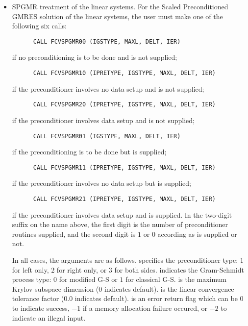 \begin{enumerate}
\begin{itemize}
  \item
    SPGMR treatment of the linear systems.
    For the Scaled Preconditioned GMRES solution of the linear systems,
    the user must make one of the following six calls:
\begin{verbatim}
      CALL FCVSPGMR00 (IGSTYPE, MAXL, DELT, IER)              
\end{verbatim}
    if no preconditioning is to be done and  is not supplied;
\begin{verbatim}
      CALL FCVSPGMR10 (IPRETYPE, IGSTYPE, MAXL, DELT, IER)
\end{verbatim}
    if the preconditioner involves no data setup and  is not
    supplied;
\begin{verbatim}
      CALL FCVSPGMR20 (IPRETYPE, IGSTYPE, MAXL, DELT, IER)
\end{verbatim}
    if the preconditioner involves data setup and  is not
    supplied;
\begin{verbatim}
      CALL FCVSPGMR01 (IGSTYPE, MAXL, DELT, IER)
\end{verbatim}
    if the preconditioning is to be done but  is supplied;
\begin{verbatim}
      CALL FCVSPGMR11 (IPRETYPE, IGSTYPE, MAXL, DELT, IER)
\end{verbatim}
    if the preconditioner involves no data setup but  is supplied;
\begin{verbatim}
      CALL FCVSPGMR21 (IPRETYPE, IGSTYPE, MAXL, DELT, IER)
\end{verbatim}
    if the preconditioner involves data setup and  is supplied.
    In the two-digit suffix on the name above, the first digit is the number of
    preconditioner routines supplied, and the second digit is $1$ or $0$ according as
     is supplied or not.
    
    In all cases, the arguments are as follows.
     specifies the preconditioner type: 
       $1$ for left only, $2$ for right only, or $3$ for both sides.
     indicates the Gram-Schmidt process type: 
       $0$ for modified G-S or  $1$ for classical G-S.
     is the maximum Krylov subspace dimension ($0$ indicates default).
     is the linear convergence tolerance factor ($0.0$ indicates default).
     is an error return flag which can be $0$ to indicate success, 
       $-1$ if a memory allocation failure occured, or $-2$ to indicate an illegal input.


\end{itemize}
\end{enumerate}
